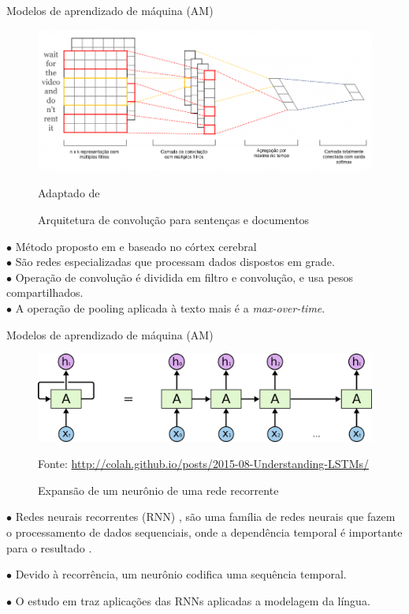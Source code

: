 \begin{frame}{Modelos de aprendizado de máquina (AM)}
\selectFont
	\begin{figure}[H]\centering
		\caption{Arquitetura de convolução para sentenças e documentos}\selectFont
		\includegraphics[scale=0.27,origin=c,]{images/CNNKIN.png}
		\label{fig:CNNText}
		
		Adaptado de 
	\end{figure}
	$\bullet$ Método proposto em  e baseado no córtex cerebral\\
	$\bullet$ São redes especializadas que processam dados dispostos em grade.\\
	$\bullet$ Operação de convolução é dividida em filtro e convolução, e  usa pesos compartilhados.\\
	$\bullet$ A operação de pooling aplicada à texto mais é a {\it max-over-time}.
\end{frame}

\begin{frame}{Modelos de aprendizado de máquina (AM)}
\selectFont
	\begin{figure}[H]\centering
		\caption{Expansão de um neurônio de uma rede recorrente}
		\includegraphics[scale=0.17,origin=c,]{images/RNN-unrolled.png}
		\label{fig:RNN-unrolled}
		
		Fonte: \url{http://colah.github.io/posts/2015-08-Understanding-LSTMs/}
	\end{figure}

	$\bullet$ Redes neurais recorrentes (RNN) \cite{elman1990finding}, são uma família de redes neurais que fazem o processamento de dados sequenciais, onde a dependência temporal é importante para o resultado \cite{Goodfellow2016}.
	
	$\bullet$ Devido à recorrência, um neurônio codifica uma sequência temporal.
	
	$\bullet$ O estudo em  traz aplicações das RNNs aplicadas a modelagem da língua.
	
\end{frame}